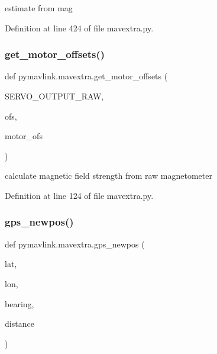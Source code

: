\begin{DoxyVerb}estimate  from mag\end{DoxyVerb}
 

Definition at line 424 of file mavextra.\+py.

\mbox{\label{namespacepymavlink_1_1mavextra_a5c02a6aebf8c43eef46c2aad3b75623a}} 
\subsubsection{\texorpdfstring{get\_motor\_offsets()}{get\_motor\_offsets()}}
{\footnotesize\ttfamily def pymavlink.\+mavextra.\+get\+\_\+motor\+\_\+offsets (\begin{DoxyParamCaption}\item[{}]{S\+E\+R\+V\+O\+\_\+\+O\+U\+T\+P\+U\+T\+\_\+\+R\+AW,  }\item[{}]{ofs,  }\item[{}]{motor\+\_\+ofs }\end{DoxyParamCaption})}

\begin{DoxyVerb}calculate magnetic field strength from raw magnetometer\end{DoxyVerb}
 

Definition at line 124 of file mavextra.\+py.

\mbox{\label{namespacepymavlink_1_1mavextra_addedb30f8a88b98176fe226bfed8aaad}} 
\subsubsection{\texorpdfstring{gps\_newpos()}{gps\_newpos()}}
{\footnotesize\ttfamily def pymavlink.\+mavextra.\+gps\+\_\+newpos (\begin{DoxyParamCaption}\item[{}]{lat,  }\item[{}]{lon,  }\item[{}]{bearing,  }\item[{}]{distance }\end{DoxyParamCaption})}

